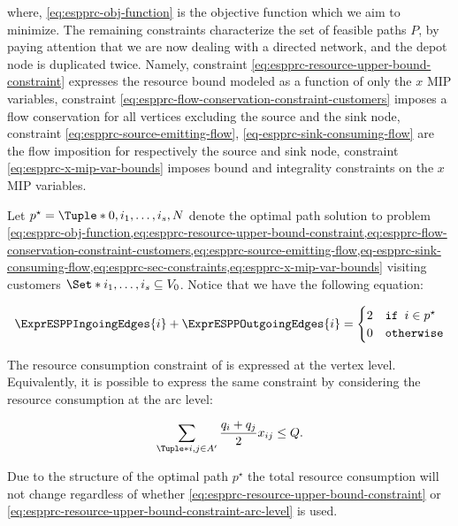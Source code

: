 where, \eqref{eq:espprc-obj-function} is the objective function which we aim to minimize.
The remaining constraints characterize the set of feasible paths $P$, by paying attention that we are now dealing with
a directed network, and the depot node is duplicated twice.
Namely, constraint \eqref{eq:espprc-resource-upper-bound-constraint} expresses the resource bound modeled as a function of only the $x$ MIP variables,
constraint \eqref{eq:espprc-flow-conservation-constraint-customers} imposes a flow conservation for all vertices excluding the source and the sink node,
constraint \eqref{eq:espprc-source-emitting-flow}, \eqref{eq-espprc-sink-consuming-flow} are the flow imposition for respectively the source and sink node,
constraint \eqref{eq:espprc-x-mip-var-bounds} imposes bound and integrality constraints on the $x$ MIP variables.

Let $p^\star = \Tuple*{0, i_1, \dots, i_s, N}$
denote the optimal path solution to problem
\cref{eq:espprc-obj-function,eq:espprc-resource-upper-bound-constraint,eq:espprc-flow-conservation-constraint-customers,eq:espprc-source-emitting-flow,eq-espprc-sink-consuming-flow,eq:espprc-sec-constraints,eq:espprc-x-mip-var-bounds}
visiting customers $\Set*{i_1, \dots, i_s} \subseteq V_0$.
Notice that we have the following equation:

\begin{equation}
	\ExprESPPIngoingEdges{i} + \ExprESPPOutgoingEdges{i} = \begin{cases}
		2 & \texttt{if } i \in p^\star \\
		0 & \texttt{otherwise}
	\end{cases}
\end{equation}

The resource consumption constraint of  is
expressed at the vertex level.
Equivalently, it is possible to express the same constraint by considering the resource consumption
at the arc level:

\begin{equation}
	\label{eq:espprc-resource-upper-bound-constraint-arc-level}
	\sum_{\Tuple*{i, j} \in A^\prime} \frac{q_i + q_j}{2} x_{ij} \le Q.
\end{equation}

Due to the structure of the optimal path $p^\star$ the total resource consumption
will not change regardless of whether
\cref{eq:espprc-resource-upper-bound-constraint} or \cref{eq:espprc-resource-upper-bound-constraint-arc-level}
is used.

